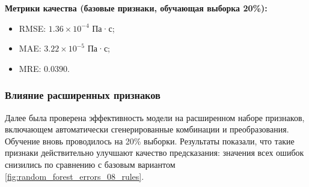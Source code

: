 \documentclass[a4paper,12pt]{article}
\begin{document}
    \begin{minipage}{\textwidth}
    \textbf{Метрики качества (базовые признаки, обучающая выборка 20\%):}
      \begin{itemize}
          \item RMSE: \( 1.36 \times 10^{-4} \) Па·с;
          \item MAE: \( 3.22 \times 10^{-5} \) Па·с;
          \item MRE: \( 0.0390 \).
      \end{itemize}
    \end{minipage}
    
    \subsubsection{Влияние расширенных признаков}
    
    Далее была проверена эффективность модели на расширенном наборе признаков, включающем автоматически сгенерированные комбинации и преобразования. Обучение вновь проводилось на 20\% выборки. Результаты показали, что такие признаки действительно улучшают качество предсказания: значения всех ошибок снизились по сравнению с базовым вариантом \autoref{fig:random_forest_errors_08_rules}.
    
\end{document}
